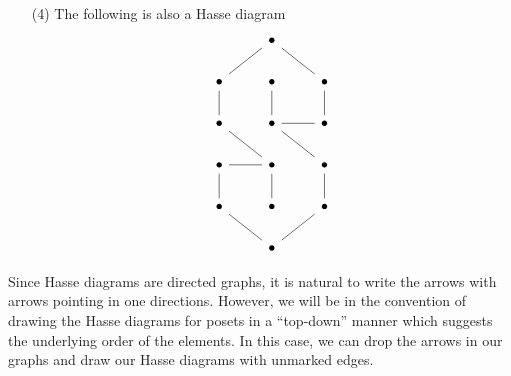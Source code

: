 \begin{example}
\begin{enumerate}
    \item[(4)] The following is also a Hasse diagram
      \[\begin{tikzcd}
  & \bullet \\
        \bullet & \bullet & \bullet \\
        \bullet & \bullet & \bullet \\
        \bullet & \bullet & \bullet \\
        \bullet & \bullet & \bullet \\
                & \bullet
                \arrow[no head, from=1-2, to=2-3]
                \arrow[no head, from=2-1, to=1-2]
                \arrow[no head, from=2-1, to=3-1]
                \arrow[no head, from=2-2, to=3-2]
                \arrow[no head, from=2-3, to=3-3]
                \arrow[no head, from=3-1, to=4-2]
                \arrow[no head, from=3-2, to=4-3]
                \arrow[no head, from=3-3, to=3-2]
                \arrow[no head, from=4-1, to=4-2]
                \arrow[no head, from=4-1, to=5-1]
                \arrow[no head, from=4-2, to=5-2]
                \arrow[no head, from=4-3, to=5-3]
                \arrow[no head, from=5-1, to=6-2]
                \arrow[no head, from=6-2, to=5-3]
      \end{tikzcd}\]
  \end{enumerate}
\end{example}

\begin{remark}
  Since Hasse diagrams are directed graphs, it is natural to write the
  arrows with arrows pointing in one directions. However, we will be
  in the convention of drawing the Hasse diagrams for posets in a
  ``top-down'' manner which suggests the underlying order of the
  elements. In this case, we can drop the arrows in our graphs and
  draw our Hasse diagrams with unmarked edges.
\end{remark}

